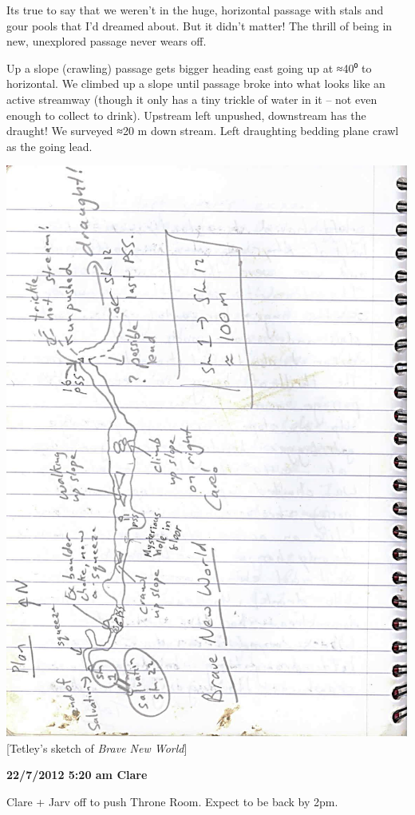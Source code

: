 Its true to say that we weren't in the huge, horizontal passage with
stals and gour pools that I'd dreamed about. But it didn't matter! The
thrill of being in new, unexplored passage never wears off.

Up a slope (crawling) passage gets bigger heading east going up at ≈40⁰
to horizontal. We climbed up a slope until passage broke into what looks
like an active streamway (though it only has a tiny trickle of water in
it -- not even enough to collect to drink). Upstream left unpushed,
downstream has the draught! We surveyed ≈20 m down stream. Left
draughting bedding plane crawl as the going lead.

\includegraphics{UgLog1012/66.jpeg}{[}Tetley's sketch of \emph{Brave New
World}{]}

\textbf{22/7/2012 5:20 am Clare}

Clare + Jarv off to push Throne Room. Expect to be back by 2pm.

